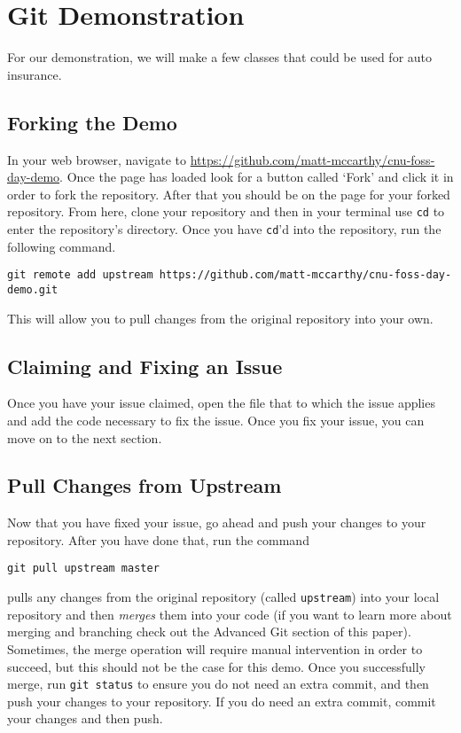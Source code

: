 \documentclass[notitlepage]{simple}
\begin{document}
\section{Git Demonstration}

For our demonstration, we will make a few classes that could be used for auto insurance.

\subsection{Forking the Demo}

In your web browser, navigate to \url{https://github.com/matt-mccarthy/cnu-foss-day-demo}.
Once the page has loaded look for a button called `Fork' and click it in order to fork the repository.
After that you should be on the page for your forked repository.
From here, clone your repository and then in your terminal use \verb|cd| to enter the repository's directory.
Once you have \verb|cd|'d into the repository, run the following command.
\begin{terminal}
\verb|git remote add upstream https://github.com/matt-mccarthy/cnu-foss-day-demo.git|
\end{terminal}
This will allow you to pull changes from the original repository into your own.

\subsection{Claiming and Fixing an Issue}


Once you have your issue claimed, open the file that to which the issue applies and add the code necessary to fix the issue.
Once you fix your issue, you can move on to the next section.

\subsection{Pull Changes from Upstream}

Now that you have fixed your issue, go ahead and push your changes to your repository.
After you have done that, run the command
\begin{terminal}
	\verb|git pull upstream master|
\end{terminal}
pulls any changes from the original repository (called \verb|upstream|) into your local repository and then \textit{merges} them into your code
(if you want to learn more about merging and branching check out the Advanced Git section of this paper).
Sometimes, the merge operation will require manual intervention in order to succeed, but this should not be the case for this demo.
Once you successfully merge, run \verb|git status| to ensure you do not need an extra commit, and then push your changes to your repository.
If you do need an extra commit, commit your changes and then push.
\end{document}
